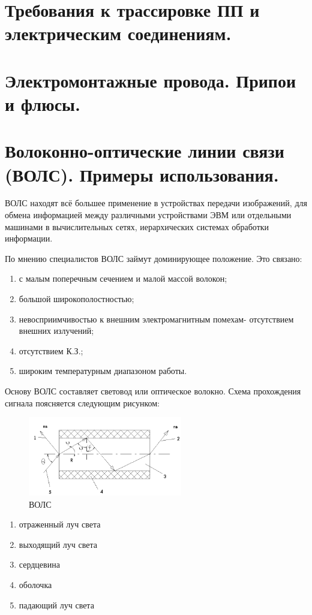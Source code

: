 \documentclass[unicode, 12pt, a4paper, oneside]{article}
\begin{document}
\section{Требования к трассировке ПП и электрическим соединениям.}

\section{Электромонтажные провода. Припои и флюсы.}

\section{Волоконно-оптические линии связи (ВОЛС). Примеры использования.}

ВОЛС находят всё большее применение в устройствах передачи изображений, для обмена информацией между различными устройствами ЭВМ или отдельными машинами в вычислительных сетях, иерархических системах обработки информации.

По мнению специалистов ВОЛС займут доминирующее положение. Это связано:

\begin{enumerate} 
\item с малым поперечным сечением и малой массой волокон;
\item большой широкополостностью;
\item невосприимчивостью к внешним электромагнитным помехам- отсутствием внешних излучений;
\item отсутствием К.З.;
\item широким температурным диапазоном работы.
\end{enumerate}

Основу ВОЛС составляет световод или оптическое волокно. Схема прохождения сигнала поясняется следующим рисунком:

\begin{figure}[H]
\centering
\includegraphics[width=0.6\textwidth]{77_opvol.png}
\caption{ВОЛС}
\end{figure}
\begin{enumerate} 
\item отраженный луч света
\item выходящий луч света
\item сердцевина
\item оболочка
\item падающий луч света
\end{enumerate} 
\end{document}

